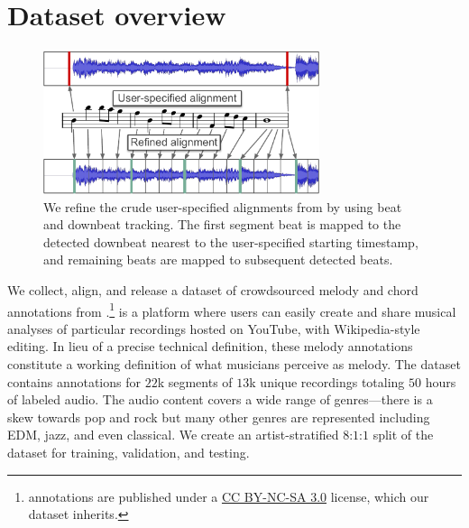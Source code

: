 \section{Dataset overview}
\label{sec:dataset}

\begin{figure}
    \centering
    \includegraphics[width=8.1cm]{figs/alignment.pdf}
    \caption{We refine the crude user-specified alignments from \hooktheory{} by using beat and downbeat tracking. The first segment beat is mapped to the detected downbeat nearest to the user-specified starting timestamp, and remaining beats are mapped to subsequent detected beats.}
 \label{fig:alignment}
\end{figure}

We collect, align, and release a dataset of crowdsourced melody and chord annotations from \hooktheory{}.\footnote{\hooktheory{} annotations are published under a \href{https://creativecommons.org/licenses/by-nc-sa/3.0/}{CC BY-NC-SA 3.0} license, which our dataset inherits.}
\hooktheory{} is a platform where users can easily create and share musical analyses of particular recordings hosted on YouTube, with Wikipedia-style editing. 
In lieu of a precise technical definition, these melody annotations constitute a working definition of what musicians perceive as melody. 
The dataset contains annotations for $22$k segments of $13$k unique recordings totaling $50$ hours of labeled audio. 
The audio content covers a wide range of genres---there is a skew towards pop and rock but many other genres are represented including EDM, jazz, and even classical. 
We create an artist-stratified $8$:$1$:$1$ split of the dataset for training, validation, and testing.


